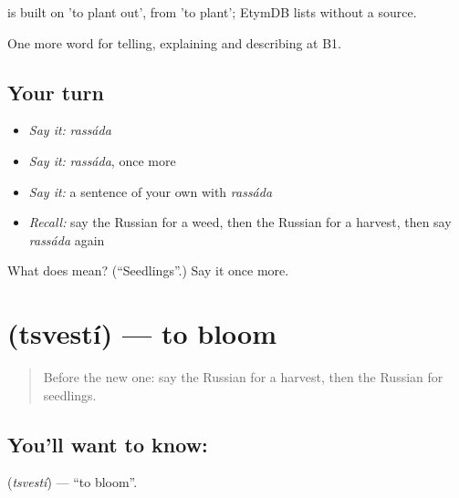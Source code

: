 \begin{cousinweb}
\emph{} is built on \emph{} 'to plant out', from \emph{} 'to plant'; EtymDB lists \emph{} without a source.
\end{cousinweb}

\begin{grammarlens}[title={What you've built}]
One more word for telling, explaining and describing at B1.
\end{grammarlens}

\subsection*{Your turn}
\begin{itemize}
\raggedright
  \item \emph{Say it:} \emph{rassáda}
  \item \emph{Say it:} \emph{rassáda}, once more
  \item \emph{Say it:} a sentence of your own with \emph{rassáda}
  \item \emph{Recall:} say the Russian for a weed, then the Russian for a harvest, then say \emph{rassáda} again
\end{itemize}

\begin{tcolorbox}[breakable,colback=teal!4,colframe=teal!35!black,title={Before you move on}]
What does  mean? (\textquotedblleft{}Seedlings\textquotedblright{}.) Say it once more.
\end{tcolorbox}
\section[\texorpdfstring{\ru{цвести} (tsvestí)}{цвести (tsvestí)}]{ (tsvestí) — to bloom}

\label{lesson:RU-C507-tsvesti}



\begin{quote}
Before the new one: say the Russian for a harvest, then the Russian for seedlings.
\end{quote}

\subsection*{You'll want to know: }
\textbf{} (\emph{tsvestí}) — \textquotedblleft{}to bloom\textquotedblright{}.

